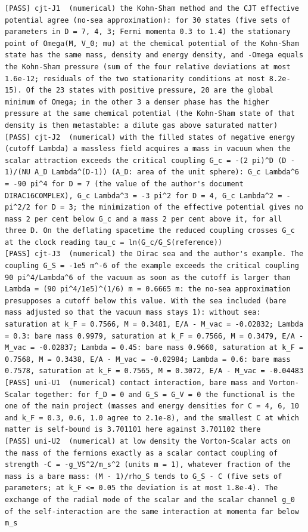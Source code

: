 \documentclass[
  10pt,
]{article}
\begin{document}
\begin{verbatim}
[PASS] cjt-J1  (numerical) the Kohn-Sham method and the CJT effective potential agree (no-sea approximation): for 30 states (five sets of parameters in D = 7, 4, 3; Fermi momenta 0.3 to 1.4) the stationary point of Omega(M, V_0; mu) at the chemical potential of the Kohn-Sham state has the same mass, density and energy density, and -Omega equals the Kohn-Sham pressure (sum of the four relative deviations at most 1.6e-12; residuals of the two stationarity conditions at most 8.2e-15). Of the 23 states with positive pressure, 20 are the global minimum of Omega; in the other 3 a denser phase has the higher pressure at the same chemical potential (the Kohn-Sham state of that density is then metastable: a dilute gas above saturated matter)
[PASS] cjt-J2  (numerical) with the filled states of negative energy (cutoff Lambda) a massless field acquires a mass in vacuum when the scalar attraction exceeds the critical coupling G_c = -(2 pi)^D (D - 1)/(NU A_D Lambda^(D-1)) (A_D: area of the unit sphere): G_c Lambda^6 = -90 pi^4 for D = 7 (the value of the author's document DIRAC16COMPLEX), G_c Lambda^3 = -3 pi^2 for D = 4, G_c Lambda^2 = -pi^2/2 for D = 3; the minimization of the effective potential gives no mass 2 per cent below G_c and a mass 2 per cent above it, for all three D. On the deflating spacetime the reduced coupling crosses G_c at the clock reading tau_c = ln(G_c/G_S(reference))
[PASS] cjt-J3  (numerical) the Dirac sea and the author's example. The coupling G_S = -1e5 m^-6 of the example exceeds the critical coupling 90 pi^4/Lambda^6 of the vacuum as soon as the cutoff is larger than Lambda = (90 pi^4/1e5)^(1/6) m = 0.6665 m: the no-sea approximation presupposes a cutoff below this value. With the sea included (bare mass adjusted so that the vacuum mass stays 1): without sea: saturation at k_F = 0.7566, M = 0.3481, E/A - M_vac = -0.02832; Lambda = 0.3: bare mass 0.9979, saturation at k_F = 0.7566, M = 0.3479, E/A - M_vac = -0.02837; Lambda = 0.45: bare mass 0.9660, saturation at k_F = 0.7568, M = 0.3438, E/A - M_vac = -0.02984; Lambda = 0.6: bare mass 0.7578, saturation at k_F = 0.7565, M = 0.3072, E/A - M_vac = -0.04483
[PASS] uni-U1  (numerical) contact interaction, bare mass and Vorton-Scalar together: for f_D = 0 and G_S = G_V = 0 the functional is the one of the main project (masses and energy densities for C = 4, 6, 10 and k_F = 0.3, 0.6, 1.0 agree to 2.1e-8), and the smallest C at which matter is self-bound is 3.701101 here against 3.701102 there
[PASS] uni-U2  (numerical) at low density the Vorton-Scalar acts on the mass of the fermions exactly as a scalar contact coupling of strength -C = -g_VS^2/m_s^2 (units m = 1), whatever fraction of the mass is a bare mass: (M - 1)/rho_S tends to G_S - C (five sets of parameters; at k_F <= 0.05 the deviation is at most 1.8e-4). The exchange of the radial mode of the scalar and the scalar channel g_0 of the self-interaction are the same interaction at momenta far below m_s

\end{verbatim}
\end{document}
